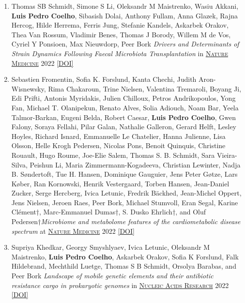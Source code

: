 \documentclass{article}
\newcommand\showdoi[1]{%
    \href{http://dx.doi.org/#1}{[DOI]}%
}
\newcommand\pubname[1]{\textsc{\uline{#1}}}
\newcommand\cosenior{†}
\begin{document}
\begin{enumerate}[resume]
\item Thomas SB Schmidt, Simone S Li, Oleksandr M Maistrenko, Wasiu Akkani, \textbf{Luis Pedro Coelho}, Sibasish Dolai, Anthony Fullam, Anna Glazek, Rajna Hercog, Hilde Herrema, Ferris Jung, Stefanie Kandels, Askarbek Orakov, Thea Van Rossum, Vladimir Benes, Thomas J Borody, Willem M de Vos, Cyriel Y Ponsioen, Max Nieuwdorp, Peer Bork \emph{Drivers and Determinants of Strain Dynamics Following Faecal Microbiota Transplantation} in \pubname{Nature Medicine} 2022 \showdoi{10.1038/s41591-022-01913-0}

\item Sebastien Fromentin, Sofia K. Forslund, Kanta Chechi, Judith Aron-Wisnewsky, Rima Chakaroun, Trine Nielsen, Valentina Tremaroli, Boyang Ji, Edi Prifti, Antonis Myridakis, Julien Chilloux, Petros Andrikopoulos, Yong Fan, Michael T. Olanipekun, Renato Alves, Solia Adiouch, Noam Bar, Yeela Talmor-Barkan, Eugeni Belda, Robert Caesar, \textbf{Luis Pedro Coelho}, Gwen Falony, Soraya Fellahi, Pilar Galan, Nathalie Galleron, Gerard Helft, Lesley Hoyles, Richard Isnard, Emmanuelle Le Chatelier, Hanna Julienne, Lisa Olsson, Helle Krogh Pedersen, Nicolas Pons, Benoit Quinquis, Christine Rouault, Hugo Roume, Joe-Elie Salem, Thomas S. B. Schmidt, Sara Vieira-Silva, Peishun Li, Maria Zimmermann-Kogadeeva, Christian Lewinter, Nadja B. Søndertoft, Tue H. Hansen, Dominique Gauguier, Jens Peter Gøtze, Lars Køber, Ran Kornowski, Henrik Vestergaard, Torben Hansen, Jean-Daniel Zucker, Serge Hercberg, Ivica Letunic, Fredrik Bäckhed, Jean-Michel Oppert, Jens Nielsen, Jeroen Raes, Peer Bork, Michael Stumvoll, Eran Segal, Karine Clément\cosenior, Marc-Emmanuel Dumas\cosenior, S. Dusko Ehrlich\cosenior, and Oluf Pedersen\cosenior \emph{Microbiome and metabolome features of the cardiometabolic disease spectrum} at \pubname{Nature Medicine} 2022 \showdoi{10.1038/s41591-022-01688-4}

\item Supriya Khedkar, Georgy Smyshlyaev, Ivica Letunic, Oleksandr M Maistrenko, \textbf{Luis Pedro Coelho}, Askarbek Orakov, Sofia K Forslund, Falk Hildebrand, Mechthild Luetge, Thomas S B Schmidt, Orsolya Barabas, and Peer Bork \emph{Landscape of mobile genetic elements and their antibiotic resistance cargo in prokaryotic genomes} in \pubname{Nucleic Acids Research} 2022 \showdoi{10.1093/nar/gkac163}


\end{enumerate}
\end{document}
